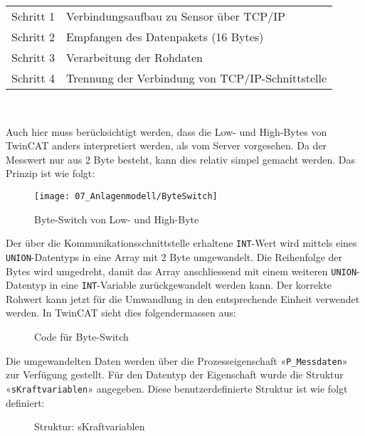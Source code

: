 		\begin{tabularx}{\textwidth}{@{}>{}p{8em} X@{}}
			Schritt 1 & 
			Verbindungsaufbau zu Sensor über TCP/IP
			\\
			Schritt 2 & 
			Empfangen des Datenpakets (16 Bytes)
			\\
			Schritt 3 & 
			Verarbeitung der Rohdaten   
			\\
			Schritt 4 & 
			Trennung der Verbindung von TCP/IP-Schnittstelle
			\\
		\end{tabularx}
		\\
		\newpage
		
		Auch hier muss berücksichtigt werden, dass die Low- und High-Bytes von TwinCAT anders interpretiert werden, als vom Server vorgesehen. Da der Messwert nur aus 2 Byte besteht, kann dies relativ simpel gemacht werden. Das Prinzip ist wie folgt:
		
		\begin{figure}[h!]
			\centering
			\texttt{[image: 07\_Anlagenmodell/ByteSwitch]}
			\caption{Byte-Switch von Low- und High-Byte}
			\label{fig:ByteSwitch}
		\end{figure} 
		
		Der über die Kommunikationsschnittstelle erhaltene \verb|INT|-Wert wird mittels eines \verb|UNION|-Datentyps in eine Array mit 2 Byte umgewandelt. Die Reihenfolge der Bytes wird umgedreht, damit das Array anschliessend mit einem weiteren \verb|UNION|-Datentyp in eine \verb|INT|-Variable zurückgewandelt werden kann. Der korrekte Rohwert kann jetzt für die Umwandlung in den entsprechende Einheit verwendet werden. In TwinCAT sieht dies folgendermassen aus: 
		
		\begin{figure}[h!]
			\centering
			\captionsetup{justification=centering}
			\caption{Code für Byte-Switch}
			\label{fig:ByteSwitchCode}
		\end{figure} 
		
		Die umgewandelten Daten werden über die Prozesseigenschaft «\verb|P_Messdaten|» zur Verfügung gestellt. Für den Datentyp der Eigenschaft wurde die Struktur «\verb|sKraftvariablen|» angegeben. Diese benutzerdefinierte Struktur ist wie folgt definiert: 
		
		\begin{figure}[h!]
			\centering
			\captionsetup{justification=centering}
			\caption{Struktur: sKraftvariablen}
			\label{fig:sKraftvariablen}
		\end{figure} 
		
